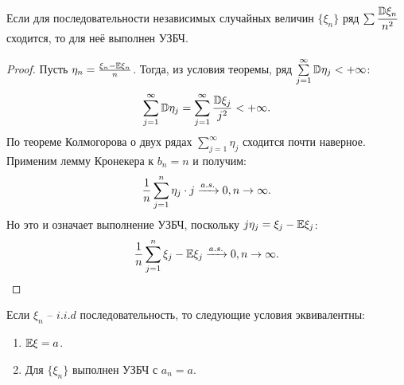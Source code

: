 \begin{theorem}
    Если для последовательности независимых случайных величин $\{\xi_n\}$ ряд $\sum \dfrac{\mathbb{D} \xi_n}{n^2}$ сходится, то для неё выполнен УЗБЧ.
\end{theorem}
\begin{proof}
    Пусть $\eta_n = \frac{\xi_n - \mathbb{E} \xi_n}{n}$. Тогда, из условия теоремы, ряд $\sum\limits_{j = 1}^\infty \mathbb{D} \eta_j < +\infty$:
    \[
        \sum\limits_{j = 1}^{\infty} \mathbb{D}\eta_j =  \sum\limits_{j = 1}^{\infty} \dfrac{\mathbb{D} \xi_j}{j^2} < +\infty.
    \]
    По теореме Колмогорова о двух рядах $\sum\limits_{j = 1}^\infty \eta_j$ сходится почти наверное.
    Применим лемму Кронекера к $b_n = n$ и получим:
    \[
        \dfrac{1}{n}\sum\limits_{j = 1}^{n} \eta_j \cdot j \xrightarrow{a.s.} 0, n \rightarrow \infty.
    \]
    Но это и означает выполнение УЗБЧ, поскольку $j\eta_j = \xi_j - \mathbb{E} \xi_j$:
    \[
        \dfrac{1}{n}\sum\limits_{j = 1}^{n} \xi_j - \mathbb{E} \xi_j \xrightarrow{a.s.} 0, n \rightarrow \infty.
    \]
\end{proof}
\begin{theorem}
    Если $\xi_n$ -- $i.i.d$ последовательность, то следующие условия эквивалентны:
    \begin{enumerate}
        \item $\mathbb{E} \xi = a$.
        \item Для $\{\xi_n\}$ выполнен УЗБЧ с $a_n = a$.
    \end{enumerate}
\end{theorem}
